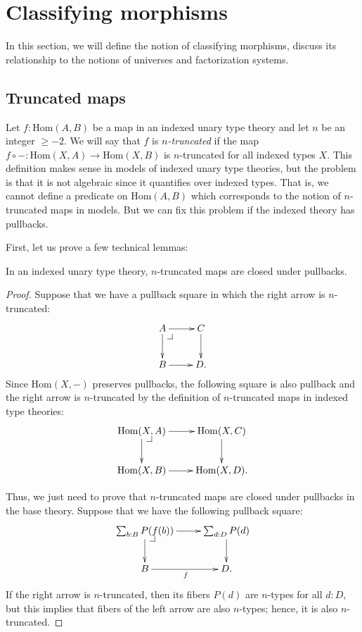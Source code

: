 \documentclass[reqno]{amsart}
\makeatletter
\theoremstyle{definition}
\theoremstyle{remark}
\newcommand{\fs}[1]{\mathrm{#1}}
\newcommand{\Hom}{\fs{Hom}}
\numberwithin{figure}{section}
\newcommand{\pb}[1][dr]{\save*!/#1-1.2pc/#1:(-1,1)@^{|-}\restore}
\makeatother
\begin{document}
\section{Classifying morphisms}
\label{sec:class}

In this section, we will define the notion of classifying morphisms, discuss its relationship to the notions of universes and factorization systems.

\subsection{Truncated maps}

Let $f : \Hom(A,B)$ be a map in an indexed unary type theory and let $n$ be an integer $\geq -2$.
We will say that $f$ is \emph{$n$-truncated} if the map $f \circ - : \Hom(X,A) \to \Hom(X,B)$ is $n$-truncated for all indexed types $X$.
This definition makes sense in models of indexed unary type theories, but the problem is that it is not algebraic since it quantifies over indexed types.
That is, we cannot define a predicate on $\Hom(A,B)$ which corresponds to the notion of $n$-truncated maps in models.
But we can fix this problem if the indexed theory has pullbacks.

First, let us prove a few technical lemmas:

\begin{lem}[trunc-pb]
In an indexed unary type theory, $n$-truncated maps are closed under pullbacks.
\end{lem}
\begin{proof}
Suppose that we have a pullback square in which the right arrow is $n$-truncated:
\[ \xymatrix{ A \ar[r] \ar[d] \pb   & C \ar[d] \\
              B \ar[r]              & D.
            } \]
Since $\Hom(X,-)$ preserves pullbacks, the following square is also pullback and the right arrow is $n$-truncated by the definition of $n$-truncated maps in indexed type theories:
\[ \xymatrix{ \Hom(X,A) \ar[r] \ar[d] \pb   & \Hom(X,C) \ar[d] \\
              \Hom(X,B) \ar[r]              & \Hom(X,D).
            } \]

Thus, we just need to prove that $n$-truncated maps are closed under pullbacks in the base theory.
Suppose that we have the following pullback square:
\[ \xymatrix{ \sum_{b : B} P(f(b)) \ar[r] \ar[d] \pb    & \sum_{d : D} P(d) \ar[d] \\
              B \ar[r]_f                                & D.
            } \]
If the right arrow is $n$-truncated, then its fibers $P(d)$ are $n$-types for all $d : D$, but this implies that fibers of the left arrow are also $n$-types; hence, it is also $n$-truncated.
\end{proof}
\end{document}
